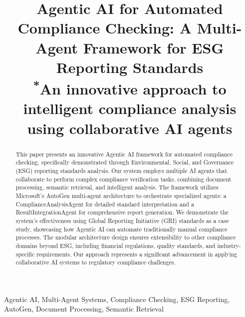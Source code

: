 \documentclass[conference]{IEEEtran}
\begin{document}
\title{Agentic AI for Automated Compliance Checking: A Multi-Agent Framework for ESG Reporting Standards\\
{\footnotesize \textsuperscript{*}An innovative approach to intelligent compliance analysis using collaborative AI agents}
}

\author{
\and
{}
}

\maketitle

\begin{abstract}
This paper presents an innovative Agentic AI framework for automated compliance checking, specifically demonstrated through Environmental, Social, and Governance (ESG) reporting standards analysis. Our system employs multiple AI agents that collaborate to perform complex compliance verification tasks, combining document processing, semantic retrieval, and intelligent analysis. The framework utilizes Microsoft's AutoGen multi-agent architecture to orchestrate specialized agents: a ComplianceAnalysisAgent for detailed standard interpretation and a ResultIntegrationAgent for comprehensive report generation. We demonstrate the system's effectiveness using Global Reporting Initiative (GRI) standards as a case study, showcasing how Agentic AI can automate traditionally manual compliance processes. The modular architecture design ensures extensibility to other compliance domains beyond ESG, including financial regulations, quality standards, and industry-specific requirements. Our approach represents a significant advancement in applying collaborative AI systems to regulatory compliance challenges.
\end{abstract}

\begin{IEEEkeywords}
Agentic AI, Multi-Agent Systems, Compliance Checking, ESG Reporting, AutoGen, Document Processing, Semantic Retrieval
\end{IEEEkeywords}
\end{document}
